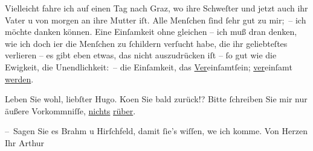 \pstart
           Vielleicht fahre ich auf einen Tag nach Graz, wo
               ihre Schweſter und jetzt
               auch ihr Vater u von morgen
               an ihre Mutter iſt. Alle
               Menſchen{ }ſind{ }ſehr gut zu mir; – ich möchte danken können. Eine Einſamkeit ohne
               gleichen – ich muß dran denken, wie ich doch i{\geminationm}er die
               Menſchen zu{ }ſchildern verſucht habe, die ihr geliebteſtes verlieren – {\pb}es gibt eben etwas, das nicht auszudrücken iſt –{ }ſo gut
               wie die Ewigkeit, die Unendlichkeit: – die Einſamkeit, das \uline{Ver}einſamtſein; \uline{ver}einſamt \uline{werden}.\pend
           
\pstart
           Leben Sie wohl, liebſter Hugo. Ko{\geminationm}en Sie bald zurück!?
               Bitte{ }ſchreiben Sie mir nur äußere Vorkommniſſe, \uline{nichts}{ }\uline{rüber}.\pend
           
\pstart
           – Sagen Sie es Brahm u Hirſchfeld, damit{ }ſie’s wiſſen, we{\geminationn} ich komme.\pend
           \pstart Von Herzen Ihr \spacefill\mbox{Arthur}\pend{}\endnumbering{}  \newcommand{\dateiname}{L00908}\newcommand{\titel}{Arthur Schnitzler an Hugo von Hofmannsthal, 22. 3. 1899}\newcommand{\editorInnen}{Martin Anton Müller und Gerd-Hermann Susen}
